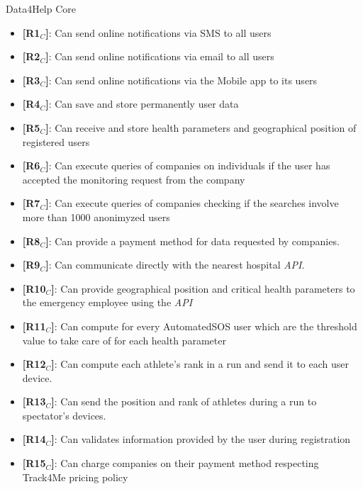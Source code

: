 \noindent Data4Help Core
\begin{itemize}
\item \textbf{[R1$_C$]}: Can send online notifications via SMS to all users 
\item \textbf{[R2$_C$]}: Can send online notifications via email to all users
\item \textbf{[R3$_C$]}: Can send online notifications via the Mobile app to its users
\item \textbf{[R4$_C$]}: Can save and store permanently user data
\item \textbf{[R5$_C$]}: Can receive and store health parameters and geographical position of registered users
\item \textbf{[R6$_C$]}: Can execute queries of companies on individuals if the user has accepted the monitoring request from the company
\item \textbf{[R7$_C$]}: Can execute queries of companies checking if the searches involve more than 1000 anonimyzed users 
\item \textbf{[R8$_C$]}: Can provide a payment method for data requested by companies.
\item \textbf{[R9$_C$]}: Can communicate directly with the nearest hospital \textit{API}.
\item \textbf{[R10$_C$]}: Can provide geographical position and critical health parameters to the emergency employee using the \textit{API}
\item \textbf{[R11$_C$]}: Can compute for every AutomatedSOS user which are the threshold value to take care of for each health parameter
\item \textbf{[R12$_C$]}: Can compute each athlete's rank in a run and send it to each user device.
\item \textbf{[R13$_C$]}: Can send the position and rank of athletes during a run to spectator's devices.
\item \textbf{[R14$_C$]}: Can validates information provided by the user during registration
\item \textbf{[R15$_C$]}: Can charge companies on their payment method respecting Track4Me pricing policy



\end{itemize}
